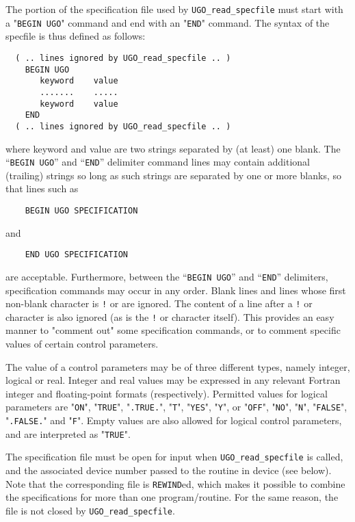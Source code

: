 \documentclass{galahad}
\newcommand{\packagename}{UGO}
\begin{document}
The portion of the specification file used by
{\tt \packagename\_read\_specfile}
must start
with a "{\tt BEGIN \packagename}" command and end with an
"{\tt END}" command.  The syntax of the specfile is thus defined as follows:
\begin{verbatim}
  ( .. lines ignored by UGO_read_specfile .. )
    BEGIN UGO
       keyword    value
       .......    .....
       keyword    value
    END
  ( .. lines ignored by UGO_read_specfile .. )
\end{verbatim}
where keyword and value are two strings separated by (at least) one blank.
The ``{\tt BEGIN \packagename}'' and ``{\tt END}'' delimiter command lines
may contain additional (trailing) strings so long as such strings are
separated by one or more blanks, so that lines such as
\begin{verbatim}
    BEGIN UGO SPECIFICATION
\end{verbatim}
and
\begin{verbatim}
    END UGO SPECIFICATION
\end{verbatim}
are acceptable. Furthermore,
between the
``{\tt BEGIN \packagename}'' and ``{\tt END}'' delimiters,
specification commands may occur in any order.  Blank lines and
lines whose first non-blank character is {\tt !} or {\tt *} are ignored.
The content
of a line after a {\tt !} or {\tt *} character is also
ignored (as is the {\tt !} or {\tt *}
character itself). This provides an easy manner to "comment out" some
specification commands, or to comment specific values
of certain control parameters.

The value of a control parameters may be of three different types, namely
integer, logical or real.
Integer and real values may be expressed in any relevant Fortran integer and
floating-point formats (respectively). Permitted values for logical
parameters are "{\tt ON}", "{\tt TRUE}", "{\tt .TRUE.}", "{\tt T}",
"{\tt YES}", "{\tt Y}", or "{\tt OFF}", "{\tt NO}",
"{\tt N}", "{\tt FALSE}", "{\tt .FALSE.}" and "{\tt F}".
Empty values are also allowed for
logical control parameters, and are interpreted as "{\tt TRUE}".

The specification file must be open for
input when {\tt \packagename\_read\_specfile}
is called, and the associated device number
passed to the routine in device (see below).
Note that the corresponding
file is {\tt REWIND}ed, which makes it possible to combine the specifications
for more than one program/routine.  For the same reason, the file is not
closed by {\tt \packagename\_read\_specfile}.
\end{document}

